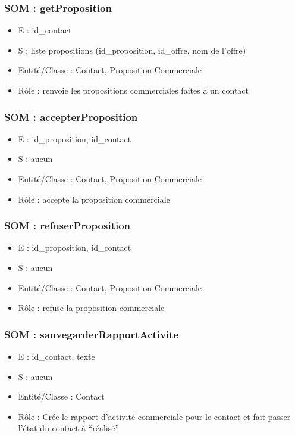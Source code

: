 \subsubsection{SOM : getProposition}
\begin{itemize}
\item E : id\_contact
\item S : liste propositions (id\_proposition, id\_offre, nom de l’offre)
\item Entité/Classe : Contact, Proposition Commerciale
\item Rôle : renvoie les propositions commerciales faites à un contact
\end{itemize}
\subsubsection{SOM : accepterProposition}
\begin{itemize}
\item E : id\_proposition, id\_contact
\item S : aucun
\item Entité/Classe : Contact, Proposition Commerciale
\item Rôle : accepte la proposition commerciale
\end{itemize}
\subsubsection{SOM : refuserProposition}
\begin{itemize}
\item E : id\_proposition, id\_contact
\item S : aucun
\item Entité/Classe : Contact, Proposition Commerciale
\item Rôle : refuse la proposition commerciale
\end{itemize}
\subsubsection{SOM : sauvegarderRapportActivite}
\begin{itemize}
\item E : id\_contact, texte
\item S : aucun
\item Entité/Classe : Contact
\item Rôle : Crée le rapport d’activité commerciale pour le contact et fait passer l’état du
contact à “réalisé”
\end{itemize}
